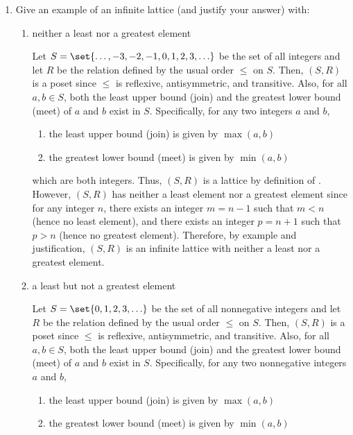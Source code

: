 \begin{enumerate}
  \newpage
  \item Give an example of an infinite lattice (and justify your answer) with: 
  \begin{enumerate}
    \item neither a least nor a greatest element
    \begin{subanswer}
      Let $S = \set{\ldots, -3, -2, -1, 0, 1, 2, 3, \ldots}$ be the set of all integers and let $R$ be the relation defined by the usual order $\leq$ on $S$.
      Then, $(S, R)$ is a poset since $\leq$ is reflexive, antisymmetric, and transitive.
      Also, for all $a, b \in S$, both the least upper bound (join) and the greatest lower bound (meet) of $a$ and $b$ exist in $S$.
      Specifically, for any two integers $a$ and $b$, 
      \begin{enumerate}
        \item the least upper bound (join) is given by $\max(a,b)$
        \item the greatest lower bound (meet) is given by $\min(a,b)$
      \end{enumerate}
      which are both integers. Thus, $(S, R)$ is a lattice by definition of .\proofstep
      However, $(S, R)$ has neither a least element nor a greatest element since for any integer $n$, 
      there exists an integer $m = n - 1$ such that $m < n$ (hence no least element), 
      and there exists an integer $p = n + 1$ such that $p > n$ (hence no greatest element).\proofstep
      Therefore, by example and justification, $(S, R)$ is an infinite lattice with neither a least nor a greatest element.
    \end{subanswer}
    \item a least but not a greatest element
    \begin{subanswer}
      Let $S = \set{0, 1, 2, 3, \ldots}$ be the set of all nonnegative integers and let $R$ be the relation defined by the usual order $\leq$ on $S$.
      Then, $(S, R)$ is a poset since $\leq$ is reflexive, antisymmetric, and transitive.
      Also, for all $a, b \in S$, both the least upper bound (join) and the greatest lower bound (meet) of $a$ and $b$ exist in $S$.
      Specifically, for any two nonnegative integers $a$ and $b$, 
      \begin{enumerate}
        \item the least upper bound (join) is given by $\max(a,b)$
        \item the greatest lower bound (meet) is given by $\min(a,b)$
      \end{enumerate}

\end{subanswer}
\end{enumerate}
\end{enumerate}
